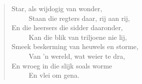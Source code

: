 \begin{verse}
Star, als wijdogig van wonder, \\ 
\ \ \ \ \ Staan die regters daar, rij aan rij, \\ 
En die heersers die sidder daaronder, \\ 
\ \ \ \ \ Kan die blik van triljoene nie lij, \\ 
Smeek beskerming van heuwels en storme, \\ 
\ \ \ \ \ Van ’n wereld, wat weier te dra, \\ 
En wroeg in die slijk soals worme \\ 
\ \ \ \ \ En vlei om gena. \\ 
\end{verse}